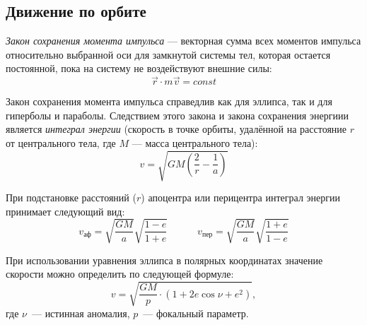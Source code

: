 \subsection{Движение по орбите}

\textit{Закон сохранения момента импульса} ---  векторная сумма всех моментов 
импульса относительно выбранной оси для замкнутой системы тел, которая остается 
постоянной, пока на систему не воздействуют внешние силы:
\begin{equation}
\vec{r} \cdot m\vec{v}=const  
\end{equation}

Закон сохранения момента импульса справедлив как для эллипса, так и для 
гиперболы и параболы. Следствием этого закона и закона сохранения энергиии 
является        \textit{ интеграл энергии} (скорость в точке орбиты, удалённой 
на расстояние $r$ от центрального тела, где $M$ --- масса центрального тела):
\begin{equation}v=\sqrt{GM\left(\frac2r - \frac1a\right)}
\end{equation}

При подстановке расстояний ($r$) апоцентра или перицентра интеграл энергии 
принимает следующий вид:
\begin{equation}v_{\text{аф}}=\sqrt{\frac{GM}{a}} \sqrt{\frac{1-e}{1+e}}
\quad\quad\quad v_{\text{пер}}=\sqrt{\frac{GM}{a}}\sqrt{\frac{1+e}{1-e}}
\end{equation}

При использовании уравнения эллипса в полярных координатах значение скорости 
можно определить по следующей формуле:
\begin{equation}
v = \sqrt{\frac{GM}{p}\cdot(1 + 2 e \cos \nu + e^2)},
\end{equation}
где $\nu$~--- истинная аномалия, $p$~--- фокальный параметр.
